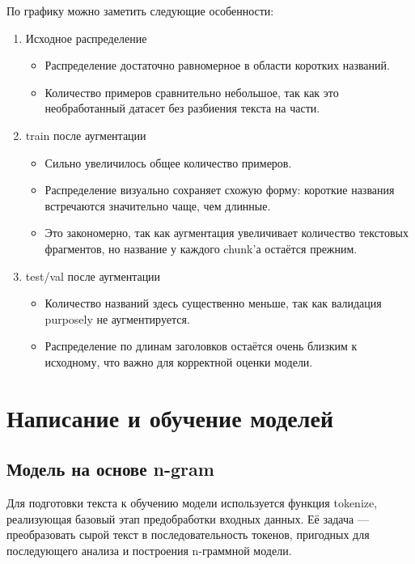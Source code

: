 \documentclass[coursework]{SCWorks}
\begin{document}
    По графику можно заметить следующие особенности:

    \begin{enumerate}
        \item Исходное распределение
        \begin{itemize}
            \item Распределение достаточно равномерное в области коротких названий.
            \item Количество примеров сравнительно небольшое, так как это необработанный датасет без разбиения текста на части.
        \end{itemize}

        \item train после аугментации
        \begin{itemize}
            \item Сильно увеличилось общее количество примеров.
            \item Распределение визуально сохраняет схожую форму: короткие названия встречаются значительно чаще, чем длинные.
            \item Это закономерно, так как аугментация увеличивает количество текстовых фрагментов, но {название} у каждого chunk’а остаётся прежним.
        \end{itemize}

        \item {test/val после аугментации}
        \begin{itemize}
            \item Количество названий здесь существенно меньше, так как валидация purposely не аугментируется.
            \item Распределение по длинам заголовков остаётся очень близким к исходному, что важно для корректной оценки модели.
        \end{itemize}
    \end{enumerate}


    \section{Написание и обучение моделей}

    \subsection{Модель на основе n-gram}


    Для подготовки текста к обучению модели используется функция {tokenize}, реализующая базовый этап предобработки входных данных.
    Её задача — преобразовать сырой текст в последовательность токенов,
    пригодных для последующего анализа и построения n-граммной модели.
\end{document}
